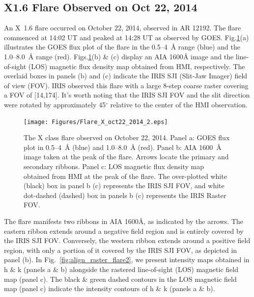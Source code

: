\subsection{X1.6 Flare Observed on Oct 22, 2014}

An X~1.6 flare occurred on October 22, 2014, observed in AR 12192. The flare commenced at 14:02 UT and peaked at 14:28 UT as observed by GOES. Fig.\ref{flare2}(a) illustrates the GOES flux plot of the flare in the 0.5{--}4~{\AA} range (blue) and the 1.0{--}8.0~{\AA} range (red). Figs.\ref{flare2}(b) \& (c) display an AIA 1600{\AA} image and the line-of-sight (LOS) magnetic flux density map obtained from HMI, respectively. The overlaid boxes in panels (b) and (c) indicate the IRIS SJI (Slit-Jaw Imager) field of view (FOV). IRIS observed this flare with a large 8-step coarse raster covering a FOV of [14\arcsec,174\arcsec]. It's worth noting that the IRIS SJI FOV and the slit direction were rotated by approximately 45$^\circ$ relative to the center of the HMI observation.

\begin{figure}[ht!]
    \centering
\hspace*{-.5in}
\texttt{[image: Figures/Flare\_X\_oct22\_2014\_2.eps]}
\caption{The X class flare observed on October 22, 2014. Panel a: GOES flux plot in 0.5{--}4~{\AA} (blue) and 1.0{--}8.0~{\AA} (red). Panel b: AIA 1600~{\AA} image taken at the peak of the flare. Arrows locate the primary and secondary ribbons. Panel c: LOS magnetic flux density map obtained from HMI at the peak of the flare. The over-plotted white (black) box in panel b (c) represents the IRIS SJI FOV, and white dot-dashed (dashed) box in panels b (c) represents the IRIS Raster FOV.}\label{flare2}
\end{figure}

The flare manifests two ribbons in AIA 1600{\AA}, as indicated by the arrows. The eastern ribbon extends around a negative field region and is entirely covered by the IRIS SJI FOV. Conversely, the western ribbon extends around a positive field region, with only a portion of it covered by the IRIS SJI FOV, as depicted in panel (b). In Fig.~\ref{fig:align_raster_flare2}, we present intensity maps obtained in   h \& k (panels a \& b) alongside the rastered line-of-sight (LOS) magnetic field map (panel c). The black \& green dashed contours in the LOS magnetic field map (panel c) indicate the intensity contours of   h \& k (panels a \& b).

